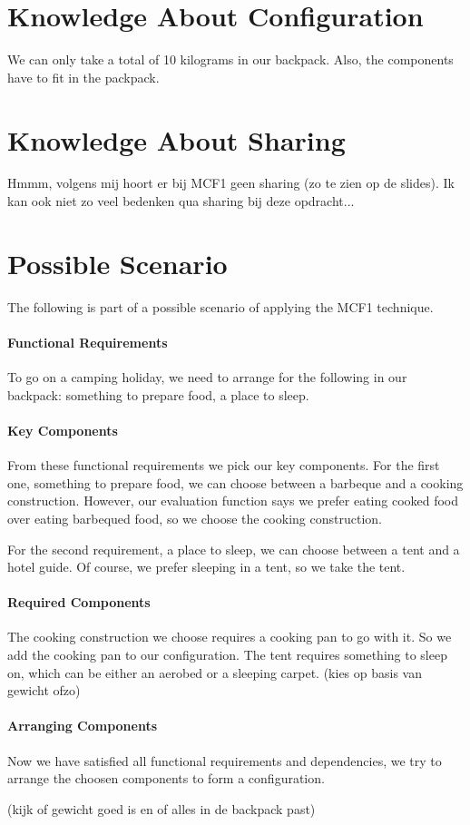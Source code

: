 \documentclass[a4paper,11pt]{article}
\begin{document}
\section*{Knowledge About Configuration}

We can only take a total of 10 kilograms in our backpack.
Also, the components have to fit in the packpack.


\section*{Knowledge About Sharing}

Hmmm, volgens mij hoort er bij MCF1 geen sharing (zo te zien
op de slides). Ik kan ook niet zo veel bedenken qua sharing
bij deze opdracht...


\section*{Possible Scenario}

The following is part of a possible scenario of applying the
MCF1 technique.

\paragraph{Functional Requirements}

To go on a camping holiday, we need to arrange for the following
in our backpack: something to prepare food, a place to sleep.

\paragraph{Key Components}

From these functional requirements we pick our key components. For
the first one, something to prepare food, we can choose between a
barbeque and a cooking construction. However, our evaluation
function says we prefer eating cooked food over eating barbequed
food, so we choose the cooking construction.

For the second requirement, a place to sleep, we can choose between
a tent and a hotel guide. Of course, we prefer sleeping in a tent,
so we take the tent.

\paragraph{Required Components}

The cooking construction we choose requires a cooking pan to go
with it. So we add the cooking pan to our configuration. The tent
requires something to sleep on, which can be either an aerobed or
a sleeping carpet. (kies op basis van gewicht ofzo)

\paragraph{Arranging Components}

Now we have satisfied all functional requirements and dependencies,
we try to arrange the choosen components to form a configuration.

(kijk of gewicht goed is en of alles in de backpack past)
\end{document}
